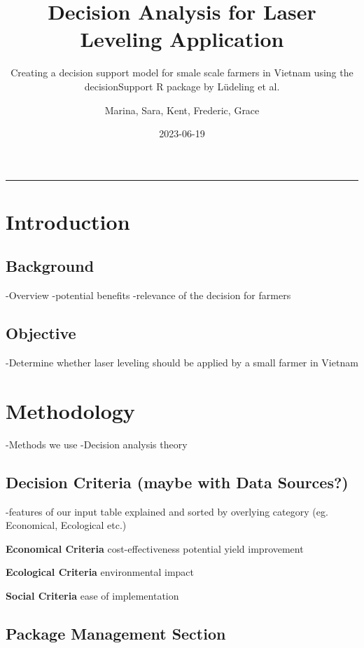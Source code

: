 \documentclass[
]{article}
\title{Decision Analysis for Laser Leveling Application}
\subtitle{Creating a decision support model for smale scale farmers in
Vietnam using the decisionSupport R package by Lüdeling et al.}
\author{Marina, Sara, Kent, Frederic, Grace}
\date{2023-06-19}
\begin{document}
\maketitle

\begin{center}\rule{0.5\linewidth}{0.5pt}\end{center}

\hypertarget{introduction}{%
\section{Introduction}\label{introduction}}

\hypertarget{background}{%
\subsection{Background}\label{background}}

-Overview -potential benefits -relevance of the decision for farmers

\hypertarget{objective}{%
\subsection{Objective}\label{objective}}

-Determine whether laser leveling should be applied by a small farmer in
Vietnam

\hypertarget{methodology}{%
\section{Methodology}\label{methodology}}

-Methods we use -Decision analysis theory

\hypertarget{decision-criteria-maybe-with-data-sources}{%
\subsection{Decision Criteria (maybe with Data
Sources?)}\label{decision-criteria-maybe-with-data-sources}}

-features of our input table explained and sorted by overlying category
(eg. Economical, Ecological etc.)

\textbf{Economical Criteria} cost-effectiveness potential yield
improvement

\textbf{Ecological Criteria} environmental impact

\textbf{Social Criteria} ease of implementation

\hypertarget{package-management-section}{%
\subsection{Package Management
Section}\label{package-management-section}}
\end{document}

